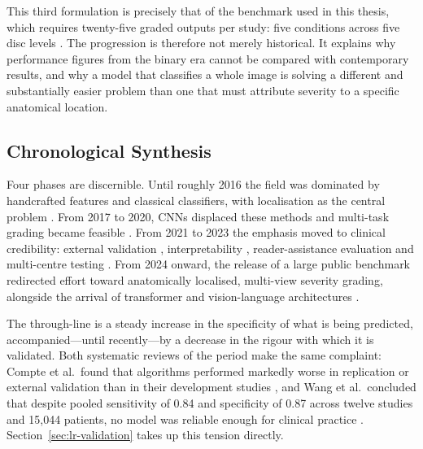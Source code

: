 This third formulation is precisely that of the benchmark used in this thesis,
which requires twenty-five graded outputs per study: five conditions across five
disc levels \cite{rsna2024rsna,richards2026the}. The progression is therefore not
merely historical. It explains why performance figures from the binary era
cannot be compared with contemporary results, and why a model that classifies a
whole image is solving a different and substantially easier problem than one
that must attribute severity to a specific anatomical location.

\subsection{Chronological Synthesis}
\label{sec:lr-chronology}

Four phases are discernible. Until roughly 2016 the field was dominated by
handcrafted features and classical classifiers, with localisation as the central
problem \cite{ghosh2012a,ghosh2014supervised}. From 2017 to 2020, CNNs displaced
these methods and multi-task grading became feasible
\cite{jamaludin2017spinenet,lu2018deepspine,han2018spinegan}. From 2021 to 2023
the emphasis moved to clinical credibility: external validation
\cite{mcsweeney2023external}, interpretability \cite{bharadwaj2023deep,gao2022automatic},
reader-assistance evaluation \cite{lim2022improved} and multi-centre testing
\cite{yi2023deep,su2022automatic}. From 2024 onward, the release of a large
public benchmark \cite{richards2026the} redirected effort toward anatomically
localised, multi-view severity grading, alongside the arrival of transformer and
vision-language architectures
\cite{batra2025mscan,nguyen2026crossspine,islamsk2026an,zeng2025gpt4lfs}.

The through-line is a steady increase in the specificity of what is being
predicted, accompanied---until recently---by a decrease in the rigour with which
it is validated. Both systematic reviews of the period make the same complaint:
Compte et al.\ found that algorithms performed markedly worse in replication or
external validation than in their development studies \cite{compte2023are}, and
Wang et al.\ concluded that despite pooled sensitivity of 0.84 and specificity of
0.87 across twelve studies and 15{,}044 patients, no model was reliable enough
for clinical practice \cite{wang2024machine}. Section~\ref{sec:lr-validation}
takes up this tension directly.

